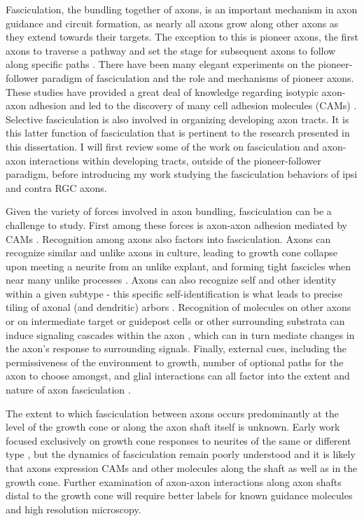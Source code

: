 Fasciculation, the bundling together of axons, is an important mechanism in axon guidance and circuit formation, as nearly all axons grow along other axons as they extend towards their targets.
The exception to this is pioneer axons, the first axons to traverse a pathway and set the stage for subsequent axons to follow along specific paths \cite{raper2010cellular,wang2013axons}.
There have been many elegant experiments on the pioneer-follower paradigm of fasciculation and the role and mechanisms of pioneer axons.
These studies have provided a great deal of knowledge regarding isotypic axon-axon adhesion and led to the discovery of many cell adhesion molecules (CAMs) \cite{raper2010cellular,wang2013axons}.
Selective fasciculation is also involved in organizing developing axon tracts.
It is this latter function of fasciculation that is pertinent to the research presented in this dissertation.
I will first review some of the work on fasciculation and axon-axon interactions within developing tracts, outside of the pioneer-follower paradigm, before introducing my work studying the fasciculation behaviors of ipsi and contra RGC axons.

Given the variety of forces involved in axon bundling, fasciculation can be a challenge to study.
First among these forces is axon-axon adhesion mediated by CAMs \cite{van1998adhesion,wang2013axons}.
Recognition among axons also factors into fasciculation.
Axons can recognize similar and unlike axons in culture, leading to growth cone collapse upon meeting a neurite from an unlike explant, and forming tight fascicles when near many unlike processes \cite{kapfhammer1986selective}.
Axons can also recognize self and other identity within a given subtype - this specific self-identification is what leads to precise tiling of axonal (and dendritic) arbors \cite{grueber2010self}.
Recognition of molecules on other axons or on intermediate target or guidepost cells or other surrounding substrata can induce signaling cascades within the axon \cite{bashaw2010signaling,wang2013axons}, which can in turn mediate changes in the axon's response to surrounding signals.
Finally, external cues, including the permissiveness of the environment to growth, number of optional paths for the axon to choose amongst, and glial interactions can all factor into the extent and nature of axon fasciculation \cite{wang2013axons}.

The extent to which fasciculation between axons occurs predominantly at the level of the growth cone or along the axon shaft itself is unknown.
Early work focused exclusively on growth cone responses to neurites of the same or different type \cite{nakajima1965selectivity}, but the dynamics of fasciculation remain poorly understood and it is likely that axons expression CAMs and other molecules along the shaft as well as in the growth cone. 
Further examination of axon-axon interactions along axon shafts distal to the growth cone will require better labels for known guidance molecules and high resolution microscopy.